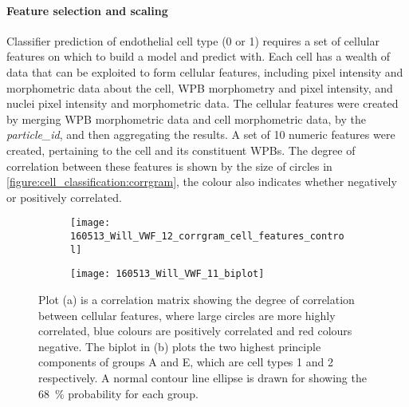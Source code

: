 \paragraph{Feature selection and scaling}
Classifier prediction of endothelial cell type (0 or 1) requires a set of cellular features on which to build a model and predict with. Each cell has a wealth of data that can be exploited to form cellular features, including pixel intensity and morphometric data about the cell, WPB morphometry and pixel intensity, and nuclei pixel intensity and morphometric data. The cellular features were created by merging WPB morphometric data and cell morphometric data, by the \emph{particle\_id}, and then aggregating the results. A set of 10 numeric features were created, pertaining to the cell and its constituent WPBs. The degree of correlation between these features is shown by the size of circles in \autoref{figure:cell_classification:corrgram}, the colour also indicates whether negatively or positively correlated.

\begin{figure}[!htbp]
	\centering
	\begin{subfigure}[b]{0.73\linewidth}
		\texttt{[image: 160513\_Will\_VWF\_12\_corrgram\_cell\_features\_control]}
		\caption{}
		\label{figure:cell_classification:corrgram}
	\end{subfigure}
	\begin{subfigure}[b]{0.73\linewidth}
		\texttt{[image: 160513\_Will\_VWF\_11\_biplot]}
		\caption{}
		\label{figure:cell_classification:ggbiplot}
	\end{subfigure}
	\caption[Correlation matrix cellular features plot and biplot of PCA]{Plot (a) is a correlation matrix showing the degree of correlation between cellular features, where large circles are more highly correlated, blue colours are positively correlated and red colours negative. The biplot in (b) plots the two highest principle components of groups A and E, which are cell types 1 and 2 respectively. A normal contour line ellipse is drawn for showing the 68~$\%$ probability for each group.}
	\label{figure:cell_classification:feature_selection_and_PCA}
\end{figure}

